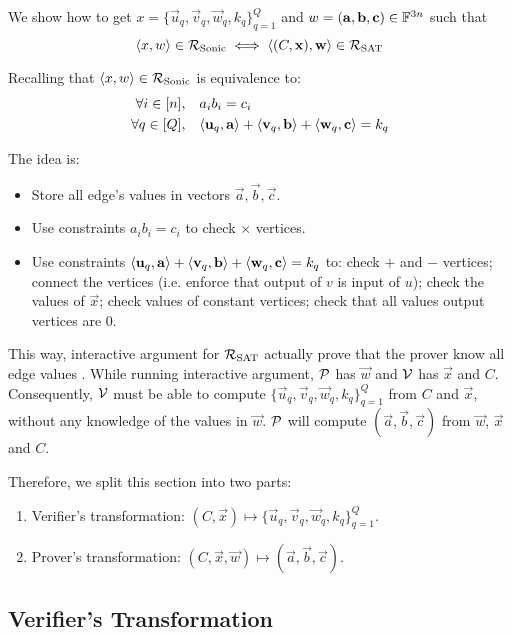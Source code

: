 We show how to get $x = \{ \Vec{u}_q, \Vec{v}_q, \Vec{w}_q, k_q \}_{q=1}^{Q}$ and $w = (\mathbf{a}, \mathbf{b}, \mathbf{c}) \in \mathbb{F}^{3n}$ such that $$\langle x, w \rangle \in \mathcal{R}_{\mathrm{Sonic}} \iff \langle (C, \mathbf{x}), \mathbf{w} \rangle \in \mathcal{R}_{\mathrm{SAT}}$$

Recalling that $\langle x, w \rangle \in \mathcal{R}_{\mathrm{Sonic}}$ is equivalence to:
\begin{align*}
\forall i \in [n],\quad & a_i b_i = c_i \\
\forall q \in [Q],\quad & \langle \mathbf{u}_q, \mathbf{a} \rangle + \langle \mathbf{v}_q, \mathbf{b} \rangle + \langle \mathbf{w}_q, \mathbf{c} \rangle = k_q
\end{align*}

The idea is:
\begin{itemize}
    \item Store all edge's values in vectors $\Vec{a}, \Vec{b}, \Vec{c}$.
    \item Use constraints $a_i b_i = c_i$ to check $\times$ vertices.
    \item Use constraints $\langle \mathbf{u}_q, \mathbf{a} \rangle + \langle \mathbf{v}_q, \mathbf{b} \rangle + \langle \mathbf{w}_q, \mathbf{c} \rangle = k_q$ to: check $+$ and $-$ vertices; connect the vertices (i.e. enforce that output of $v$ is input of $u$); check the values of $\Vec{x}$; check values of constant vertices; check that all values output vertices are $0$.
\end{itemize}

This way, interactive argument for $\mathcal{R}_{\mathrm{SAT}}$ actually prove that the prover know all edge values . While running interactive argument, $\mathcal{P}$ has $\Vec{w}$ and $\mathcal{V}$ has $\Vec{x}$ and $C$. Consequently, $\mathcal{V}$ must be able to compute $\{ \Vec{u}_q, \Vec{v}_q, \Vec{w}_q, k_q \}_{q=1}^{Q}$ from $C$ and $\Vec{x}$, without any knowledge of the values in $\Vec{w}$. $\mathcal{P}$ will compute $(\Vec{a}, \Vec{b}, \Vec{c})$ from $\Vec{w}$, $\Vec{x}$ and $C$.

Therefore, we split this section into two parts:
\begin{enumerate}
    \item Verifier's transformation: $(C, \Vec{x}) \mapsto \{ \Vec{u}_q, \Vec{v}_q, \Vec{w}_q, k_q \}_{q=1}^{Q}$.
    \item Prover's transformation: $(C, \Vec{x}, \Vec{w}) \mapsto (\Vec{a}, \Vec{b}, \Vec{c})$.
\end{enumerate}

\subsection{Verifier's Transformation}

